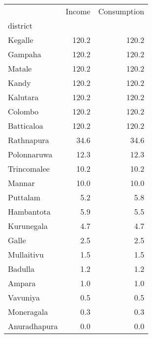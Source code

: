 \begin{tabular}{lrr}
\toprule
{} &  Income &  Consumption \\
district     &         &              \\
\midrule
Kegalle      &   120.2 &        120.2 \\
Gampaha      &   120.2 &        120.2 \\
Matale       &   120.2 &        120.2 \\
Kandy        &   120.2 &        120.2 \\
Kalutara     &   120.2 &        120.2 \\
Colombo      &   120.2 &        120.2 \\
Batticaloa   &   120.2 &        120.2 \\
Rathnapura   &    34.6 &         34.6 \\
Polonnaruwa  &    12.3 &         12.3 \\
Trincomalee  &    10.2 &         10.2 \\
Mannar       &    10.0 &         10.0 \\
Puttalam     &     5.2 &          5.8 \\
Hambantota   &     5.9 &          5.5 \\
Kurunegala   &     4.7 &          4.7 \\
Galle        &     2.5 &          2.5 \\
Mullaitivu   &     1.5 &          1.5 \\
Badulla      &     1.2 &          1.2 \\
Ampara       &     1.0 &          1.0 \\
Vavuniya     &     0.5 &          0.5 \\
Moneragala   &     0.3 &          0.3 \\
Anuradhapura &     0.0 &          0.0 \\
\bottomrule
\end{tabular}
